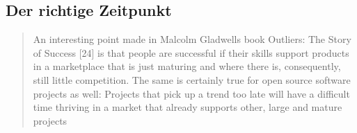 \subsection{Der richtige Zeitpunkt}



\begin{quote}
    \begin{tcolorbox}[colback=black!5!white,colframe=white!75!black,title=Direkt Zitat aus \cite{bangerthWhatMakesComputational2013} Kapitel 3.1]
        An interesting point made in Malcolm Gladwells book Outliers: The Story of Success [24] is that people
        are successful if their skills support products in a marketplace that is just maturing and where there is,
        consequently, still little competition. The same is certainly true for open source software projects as well:
        Projects that pick up a trend too late will have a difficult time thriving in a market that already supports other,
        large and mature projects
    \end{tcolorbox}
\end{quote}